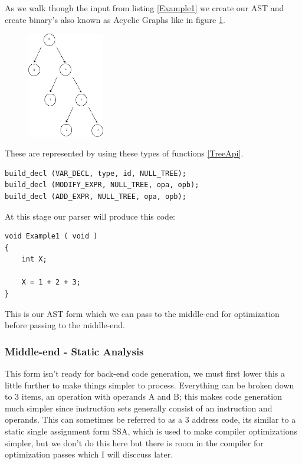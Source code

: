 \documentclass[defaultstyle,11pt]{article}
\begin{document}
As we walk though the input from listing \ref{Example1} we create our AST and create binary's also known
as Acyclic Graphs like in figure \ref{fig:DAG}.

\begin{figure}[h!]
\centering
 \label{fig:DAG}
 \includegraphics[totalheight=0.3\textheight, width=0.3\textwidth]{DAG1.png}
\end{figure}

These are represented by using these types of functions \ref{TreeApi}.

\begin{lstlisting}
build_decl (VAR_DECL, type, id, NULL_TREE);
build_decl (MODIFY_EXPR, NULL_TREE, opa, opb);
build_decl (ADD_EXPR, NULL_TREE, opa, opb);
\end{lstlisting}

At this stage our parser will produce this code:

\begin{lstlisting}
void Example1 ( void )
{
	int X; 

	X = 1 + 2 + 3;
}
\end{lstlisting}

This is our AST form which we can pass to the middle-end for optimization before passing to the middle-end.

\subsubsection{Middle-end - Static Analysis}
This form isn't ready for back-end code generation, we must first lower this a little further to make things simpler to process.
Everything can be broken down to 3 items, an operation with operands A and B; this makes code generation
much simpler since instruction sets generally consist of an instruction and operands.
This can sometimes be referred to as a 3 address code, its similar to a static single assignment
form SSA, which is used to make compiler optimizations simpler, but we don't do this here but there is room in the compiler
for optimization passes which I will disccuss later.
\end{document}
